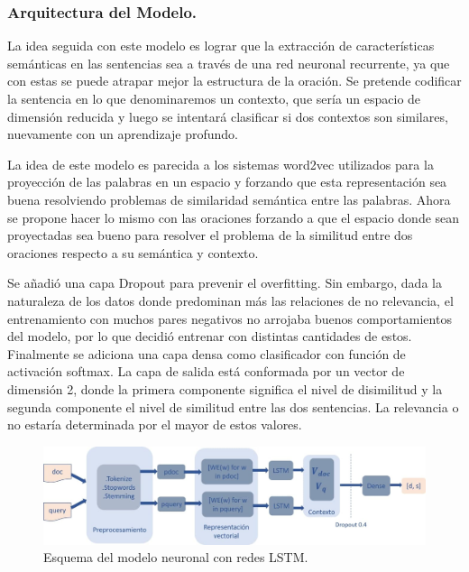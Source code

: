 \documentclass{llncs}
\begin{document}
\subsubsection{Arquitectura del Modelo.}
La idea seguida con este modelo es lograr que la extracción de características semánticas en las sentencias sea a través de una red neuronal recurrente, ya que con estas se puede atrapar mejor la estructura de la oración. Se pretende codificar la sentencia en lo que denominaremos un contexto, que sería un espacio de dimensión reducida y luego se intentará clasificar si dos contextos son similares, nuevamente con un aprendizaje profundo.

La idea de este modelo es parecida a los sistemas word2vec utilizados para la proyección de las palabras en un espacio y forzando que esta representación sea buena resolviendo problemas de similaridad semántica entre las palabras. Ahora se propone hacer lo mismo con las oraciones forzando a que el espacio donde sean proyectadas sea bueno para resolver el problema de la similitud entre dos oraciones respecto a su semántica y contexto. 

Se añadió una capa Dropout para prevenir el overfitting. Sin embargo, dada la naturaleza de los datos donde predominan más las relaciones de no relevancia, el entrenamiento con muchos pares negativos no arrojaba buenos comportamientos del modelo, por lo que decidió entrenar con distintas cantidades de estos. Finalmente se adiciona una capa densa como clasificador con función de activación softmax. La capa de salida está conformada por un vector de dimensión 2, donde la primera componente significa el nivel de disimilitud y la segunda componente el nivel de similitud entre las dos sentencias. La relevancia o no estaría determinada por el mayor de estos valores.

\begin{figure}
	\begin{center}
		\includegraphics[width=\linewidth]{ ./images/lstm.jpg}
		\caption{Esquema del modelo neuronal con redes LSTM.}
		\label{lstm}
	\end{center}
\end{figure}
\end{document}
